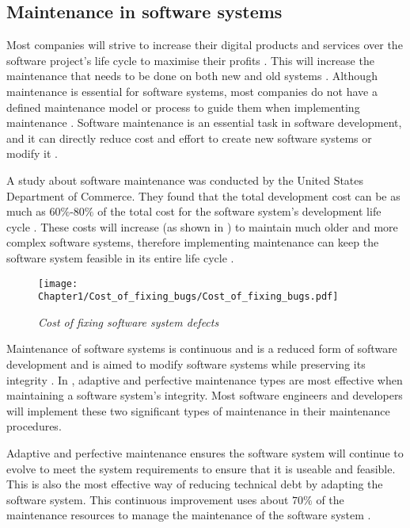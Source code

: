 \subsection{Maintenance in software systems}
Most companies will strive to increase their digital products and services over the software project's life cycle to maximise their profits \cite{Gralha2018}. This will increase the maintenance that needs to be done on both new and old systems \cite{Niu2018, Galster2019, Hasan2012}. Although maintenance is essential for software systems, most companies do not have a defined maintenance model or process to guide them when implementing maintenance \cite{Stojanov2017}. Software maintenance is an essential task in software development, and it can directly reduce cost and effort to create new software systems or modify it \cite{Thamburaj2017}.\par A study about software maintenance was conducted by the United States Department of Commerce. They found that the total development cost can be as much as $60\%$-$80\%$ of the total cost for the software system's development life cycle \cite{Ogheneovo2014, Stark1996, Ackermann2009,Tang2010}. These costs will increase (as shown in ) to maintain much older and more complex software systems, therefore implementing maintenance can keep the software system feasible in its entire life cycle \cite{Alenezi2016, Booch1986}.

\begin{figure}[!htb] %
	\centering %
	\texttt{[image: Chapter1/Cost\_of\_fixing\_bugs/Cost\_of\_fixing\_bugs.pdf]}
	\caption[Cost of fixing software system defects]
	{\textit{Cost of fixing software system defects \cite{Ogheneovo2014}}}\label{fig:CH1_Costs_of_fixing_bugs}
\end{figure} 

Maintenance of software systems is continuous and is a reduced form of software development and is aimed to modify software systems while preserving its integrity \cite{Sneed2004,Ackermann2009,Port2017}. In , adaptive and perfective maintenance types are most effective when maintaining a software system's integrity. Most software engineers and developers will implement these two significant types of maintenance in their maintenance procedures.\par Adaptive and perfective maintenance ensures the software system will continue to evolve to meet the system requirements to ensure that it is useable and feasible. This is also the most effective way of reducing technical debt by adapting the software system. This continuous improvement uses about $70\%$ of the maintenance resources to manage the maintenance of the software system \cite{Kumar2013}. 

